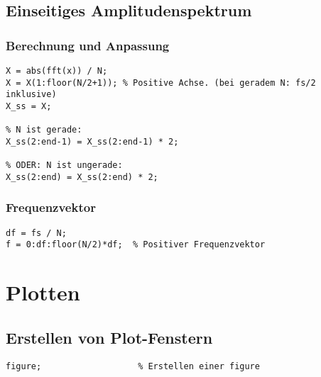 \documentclass[threecolumn, 5pt, german]{latex4ei/latex4ei_sheet}
\begin{document}
	\begin{sectionbox}
	
		\subsection{Einseitiges Amplitudenspektrum}
		
		\subsubsection{Berechnung und Anpassung}
		
		\begin{lstlisting}
X = abs(fft(x)) / N;  
X = X(1:floor(N/2+1)); % Positive Achse. (bei geradem N: fs/2 inklusive)
X_ss = X;

% N ist gerade:
X_ss(2:end-1) = X_ss(2:end-1) * 2;

% ODER: N ist ungerade:
X_ss(2:end) = X_ss(2:end) * 2;
		\end{lstlisting}

		\subsubsection{Frequenzvektor}
		\begin{lstlisting}
df = fs / N;
f = 0:df:floor(N/2)*df;  % Positiver Frequenzvektor
		\end{lstlisting}
	\end{sectionbox}
	
	\section{Plotten}
	
	\begin{sectionbox}
	
		\subsection{Erstellen von Plot-Fenstern}
		
		\begin{lstlisting}
figure;                   % Erstellen einer figure
		\end{lstlisting}
	\end{sectionbox}
	
\end{document}
